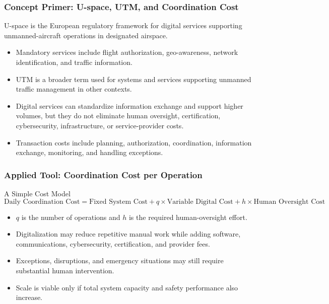 \documentclass{beamer}
\begin{document}
\begin{frame}[t]
\frametitle{Concept Primer: U-space, UTM, and Coordination Cost}
U-space is the European regulatory framework for digital services supporting unmanned-aircraft operations in designated airspace.
\begin{itemize}
\item Mandatory services include flight authorization, geo-awareness, network identification, and traffic information.
\item UTM is a broader term used for systems and services supporting unmanned traffic management in other contexts.
\item Digital services can standardize information exchange and support higher volumes, but they do not eliminate human oversight, certification, cybersecurity, infrastructure, or service-provider costs.
\item Transaction costs include planning, authorization, coordination, information exchange, monitoring, and handling exceptions.
\end{itemize}
\end{frame}

\begin{frame}[t]
\frametitle{Applied Tool: Coordination Cost per Operation}
\begin{block}{A Simple Cost Model}
\[
\text{Daily Coordination Cost}
=
\text{Fixed System Cost}
+q\times\text{Variable Digital Cost}
+h\times\text{Human Oversight Cost}
\]
\end{block}
\begin{itemize}
\item $q$ is the number of operations and $h$ is the required human-oversight effort.
\item Digitalization may reduce repetitive manual work while adding software, communications, cybersecurity, certification, and provider fees.
\item Exceptions, disruptions, and emergency situations may still require substantial human intervention.
\item Scale is viable only if total system capacity and safety performance also increase.
\end{itemize}
\end{frame}
\end{document}
